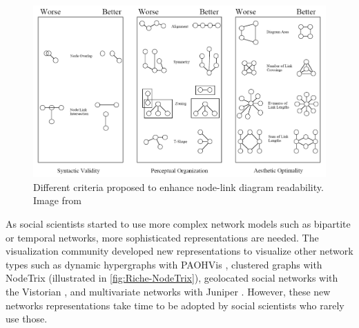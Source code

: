 \begin{figure}
    \centering %
    \includegraphics[width=1\textwidth]{static/figures/RelatedWork/Kosak-nodelinkdiagramMetrics}
    \caption{Different criteria proposed to enhance node-link diagram readability. Image from \cite{kosakAutomatingLayoutNetwork1994}}
    \label{fig:kosak-graph-drawing}
\end{figure}

As social scientists started to use more complex network models such as bipartite or temporal networks, more sophisticated representations are needed.
The visualization community developed new representations to visualize other network types such as dynamic hypergraphs with PAOHVis \cite{valdiviaAnalyzingDynamicHypergraphs2021}, clustered graphs with NodeTrix \cite{henryNodeTrixHybridVisualization2007} (illustrated in \autoref{fig:Riche-NodeTrix}), geolocated social networks with the Vistorian \cite{vistorian_mini_questionnaires}, and multivariate networks with Juniper \cite{nobreJuniperTreeTable2019}.
However, these new networks representations take time to be adopted by social scientists who rarely use those.


